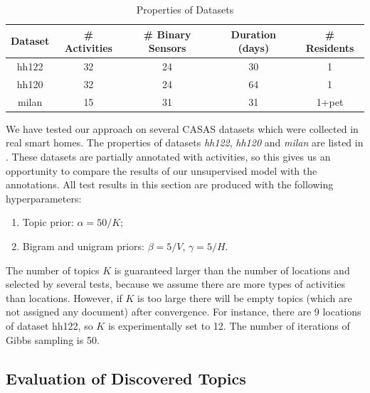 \documentclass{article}
\begin{document}
{%
\begin{table}[!b]
\centering
\scriptsize
\begin{tabular}{ccccc}
\toprule
 Dataset & \# Activities & \# Binary Sensors & Duration (days) & \# Residents \\
\midrule
hh122       & 32 & 24 & 30 & 1     \\
hh120      & 32 & 24 & 64 & 1     \\
milan   & 15 & 31 & 31 & 1+pet \\
\bottomrule
\end{tabular}
\caption{Properties of Datasets}
\label{tab:raw2}
\end{table}
}

We have tested our approach on several CASAS datasets which were collected in real smart homes. 
The properties of datasets \textit{hh122}, \textit{hh120} \cite{cook2013casas} and \textit{milan} \cite{cook2009assessing} are listed in . 
These datasets are partially annotated with activities, so this gives us an opportunity to compare the results of our unsupervised model with the annotations. 
All test results in this section are produced with the following hyperparameters:
\begin{enumerate}
\item Topic prior: $\alpha = 50 / K$;
\item Bigram and unigram priors: $\beta = 5 / V$, $\gamma = 5 / H$.
\end{enumerate}
The number of topics $K$ is guaranteed larger than the number of locations and selected by several tests, because we assume there are more types of activities than locations. However, if $K$ is too large there will be empty topics (which are not assigned any document) after convergence. For instance, there are 9 locations of dataset hh122, so $K$ is experimentally set to 12. 
The number of iterations of Gibbs sampling is 50.

\subsection{Evaluation of Discovered Topics}
\end{document}
